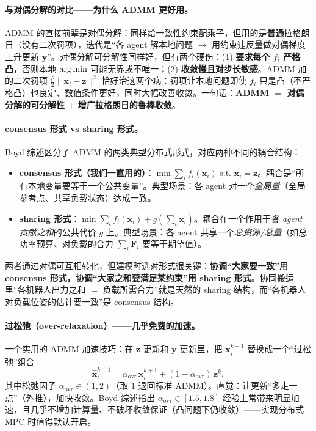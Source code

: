 \paragraph{与对偶分解的对比——为什么 ADMM 更好用。}
ADMM 的直接前辈是对偶分解：同样给一致性约束配乘子，但用的是\textbf{普通}拉格朗日（没有二次罚项），迭代是“各 agent 解本地问题 $\to$ 用约束违反量做对偶梯度上升更新 $\mathbf{y}$”\cite{nedic2009distributed}。对偶分解可分解性同样好，但有两个硬伤：(1) \textbf{要求每个 $f_i$ 严格凸}，否则本地 $\operatorname*{arg\,min}$ 可能无界或不唯一；(2) \textbf{收敛慢且对步长敏感}。ADMM 加的二次罚项 $\tfrac\rho2\|\mathbf{x}_i-\mathbf{z}\|^2$ 恰好治这两个病：罚项让本地问题即使 $f_i$ 只是凸（不严格凸）也良定、数值条件更好，同时大幅改善收敛。一句话：\textbf{ADMM $=$ 对偶分解的可分解性 $+$ 增广拉格朗日的鲁棒收敛}。

\paragraph{consensus 形式 vs sharing 形式。}
Boyd 综述区分了 ADMM 的两类典型分布式形式，对应两种不同的耦合结构：
\begin{itemize}
  \item \textbf{consensus 形式（我们一直用的）}：$\min\sum_i f_i(\mathbf{x}_i)$ s.t. $\mathbf{x}_i=\mathbf{z}$。耦合是“所有本地变量要等于一个公共变量”。典型场景：各 agent 对一个\emph{全局量}（全局参考点、共享负载状态）达成一致。
  \item \textbf{sharing 形式}：$\min\sum_i f_i(\mathbf{x}_i)+g(\sum_i\mathbf{x}_i)$。耦合在一个作用于\emph{各 agent 贡献之和}的公共代价 $g$ 上。典型场景：各 agent 共享一个\emph{总资源/总量}（如总功率预算、对负载的合力 $\sum_i\mathbf{F}_i$ 要等于期望值）。
\end{itemize}
两者通过对偶可互相转化，但建模时选对形式很关键：\textbf{协调“大家要一致”用 consensus 形式，协调“大家之和要满足某约束”用 sharing 形式}。协同搬运里“各机器人出力之和 $=$ 负载所需合力”就是天然的 sharing 结构，而“各机器人对负载位姿的估计要一致”是 consensus 结构。

\paragraph{过松弛（over-relaxation）——几乎免费的加速。}
一个实用的 ADMM 加速技巧：在 $\mathbf{z}$-更新和 $\mathbf{y}$-更新里，把 $\mathbf{x}_i^{k+1}$ 替换成一个“过松弛”组合
\begin{equation}
  \hat{\mathbf{x}}_i^{k+1}=\alpha_{\text{ovr}}\,\mathbf{x}_i^{k+1}+(1-\alpha_{\text{ovr}})\,\mathbf{z}^k,
  \label{eq:cs-overrelax}
\end{equation}
其中松弛因子 $\alpha_{\text{ovr}}\in(1,2)$（取 1 退回标准 ADMM）。直觉：让更新“多走一点”（外推），加快收敛。Boyd 综述指出 $\alpha_{\text{ovr}}\in[1.5,1.8]$ 经验上常带来明显加速，且几乎不增加计算量、不破坏收敛保证（凸问题下仍收敛）——实现分布式 MPC 时值得默认开启。

